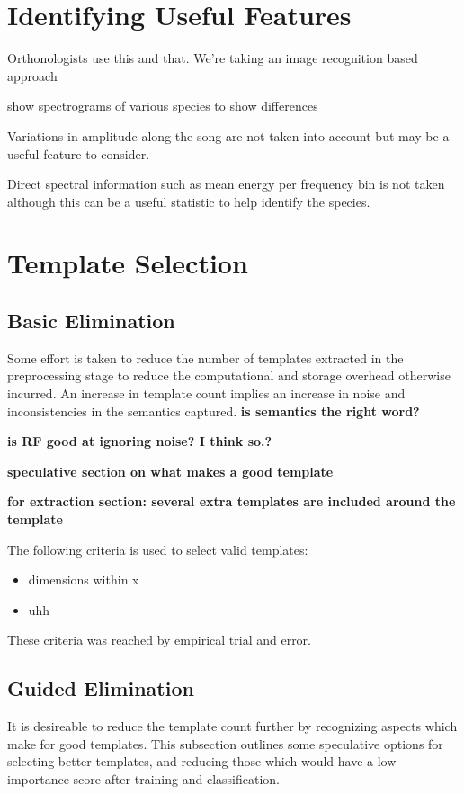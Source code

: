 \section{Identifying Useful Features}

Orthonologists use this and that.
We're taking an image recognition based approach

show spectrograms of various species to show differences

Variations in amplitude along the song are not taken into account but may be a 
useful feature to consider.

Direct spectral information such as mean energy per frequency bin is not taken
although this can be a useful statistic to help identify the species.

\section{Template Selection}
\subsection{Basic Elimination}
Some effort is taken to reduce the number of templates extracted in the
preprocessing stage to reduce the computational and storage overhead otherwise
incurred.
An increase in template count implies an increase in noise and inconsistencies
in the semantics captured. \textbf{is semantics the right word?}

\textbf{is RF good at ignoring noise? I think so.?}

\textbf{speculative section on what makes a good template}

\textbf{for extraction section: several extra templates are included around the template}

The following criteria is used to select valid templates:
\begin{itemize}
\item dimensions within x
\item uhh
\end{itemize}
These criteria was reached by empirical trial and error.

\subsection{Guided Elimination}
It is desireable to reduce the template count further by recognizing aspects which
make for good templates. This subsection outlines some speculative options for
selecting better templates, and reducing those which would have a low importance
score after training and classification.

